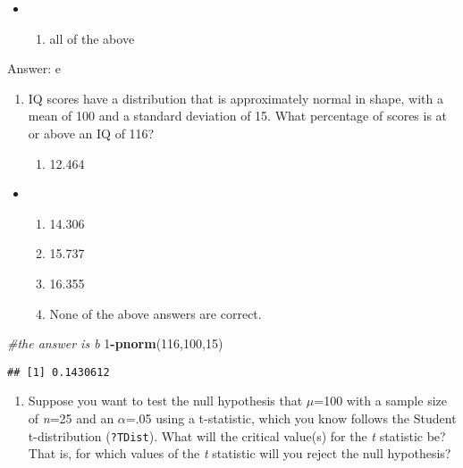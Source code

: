\documentclass[]{article}
\newenvironment{Shaded}{\begin{snugshade}}{\end{snugshade}}
\newcommand{\KeywordTok}[1]{\textcolor[rgb]{0.13,0.29,0.53}{\textbf{#1}}}
\newcommand{\DecValTok}[1]{\textcolor[rgb]{0.00,0.00,0.81}{#1}}
\newcommand{\CommentTok}[1]{\textcolor[rgb]{0.56,0.35,0.01}{\textit{#1}}}
\newcommand{\OperatorTok}[1]{\textcolor[rgb]{0.81,0.36,0.00}{\textbf{#1}}}
\newcommand{\NormalTok}[1]{#1}
\providecommand{\tightlist}{%
  \setlength{\itemsep}{0pt}\setlength{\parskip}{0pt}}
\begin{document}
\begin{itemize}
\item
  \begin{enumerate}
  \def\labelenumi{\alph{enumi}.}
  \setcounter{enumi}{4}
  \tightlist
  \item
    all of the above
  \end{enumerate}
\end{itemize}

Answer: e

\begin{enumerate}
\def\labelenumi{\arabic{enumi}.}
\setcounter{enumi}{19}
\item
  IQ scores have a distribution that is approximately normal in shape,
  with a mean of 100 and a standard deviation of 15. What percentage of
  scores is at or above an IQ of 116?

  \begin{enumerate}
  \def\labelenumii{\alph{enumii}.}
  \tightlist
  \item
    12.464
  \end{enumerate}
\end{enumerate}

\begin{itemize}
\item
  \begin{enumerate}
  \def\labelenumi{\alph{enumi}.}
  \setcounter{enumi}{1}
  \tightlist
  \item
    14.306
  \item
    15.737
  \item
    16.355
  \item
    None of the above answers are correct.
  \end{enumerate}
\end{itemize}

\begin{Shaded}
\begin{Highlighting}[]
\CommentTok{#the answer is b}
\DecValTok{1}\OperatorTok{-}\KeywordTok{pnorm}\NormalTok{(}\DecValTok{116}\NormalTok{,}\DecValTok{100}\NormalTok{,}\DecValTok{15}\NormalTok{)}
\end{Highlighting}
\end{Shaded}

\begin{verbatim}
## [1] 0.1430612
\end{verbatim}

\begin{enumerate}
\def\labelenumi{\arabic{enumi}.}
\setcounter{enumi}{20}
\tightlist
\item
  Suppose you want to test the null hypothesis that \(\mu\)=100 with a
  sample size of \emph{n}=25 and an \(\alpha\)=.05 using a t-statistic,
  which you know follows the Student t-distribution (\texttt{?TDist}).
  What will the critical value(s) for the \emph{t} statistic be? That
  is, for which values of the \emph{t} statistic will you reject the
  null hypothesis?
\end{enumerate}
\end{document}
